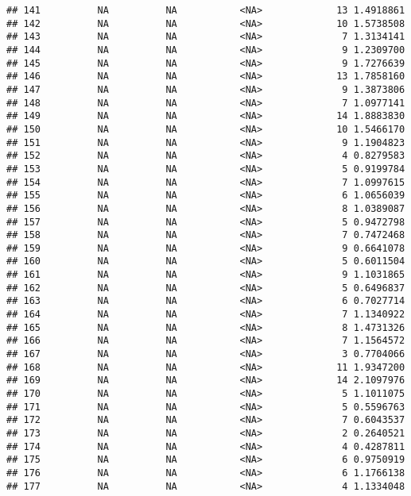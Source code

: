 \documentclass[]{article}
\begin{document}
\begin{verbatim}
## 141          NA          NA           <NA>             13 1.4918861
## 142          NA          NA           <NA>             10 1.5738508
## 143          NA          NA           <NA>              7 1.3134141
## 144          NA          NA           <NA>              9 1.2309700
## 145          NA          NA           <NA>              9 1.7276639
## 146          NA          NA           <NA>             13 1.7858160
## 147          NA          NA           <NA>              9 1.3873806
## 148          NA          NA           <NA>              7 1.0977141
## 149          NA          NA           <NA>             14 1.8883830
## 150          NA          NA           <NA>             10 1.5466170
## 151          NA          NA           <NA>              9 1.1904823
## 152          NA          NA           <NA>              4 0.8279583
## 153          NA          NA           <NA>              5 0.9199784
## 154          NA          NA           <NA>              7 1.0997615
## 155          NA          NA           <NA>              6 1.0656039
## 156          NA          NA           <NA>              8 1.0389087
## 157          NA          NA           <NA>              5 0.9472798
## 158          NA          NA           <NA>              7 0.7472468
## 159          NA          NA           <NA>              9 0.6641078
## 160          NA          NA           <NA>              5 0.6011504
## 161          NA          NA           <NA>              9 1.1031865
## 162          NA          NA           <NA>              5 0.6496837
## 163          NA          NA           <NA>              6 0.7027714
## 164          NA          NA           <NA>              7 1.1340922
## 165          NA          NA           <NA>              8 1.4731326
## 166          NA          NA           <NA>              7 1.1564572
## 167          NA          NA           <NA>              3 0.7704066
## 168          NA          NA           <NA>             11 1.9347200
## 169          NA          NA           <NA>             14 2.1097976
## 170          NA          NA           <NA>              5 1.1011075
## 171          NA          NA           <NA>              5 0.5596763
## 172          NA          NA           <NA>              7 0.6043537
## 173          NA          NA           <NA>              2 0.2640521
## 174          NA          NA           <NA>              4 0.4287811
## 175          NA          NA           <NA>              6 0.9750919
## 176          NA          NA           <NA>              6 1.1766138
## 177          NA          NA           <NA>              4 1.1334048

\end{verbatim}
\end{document}
